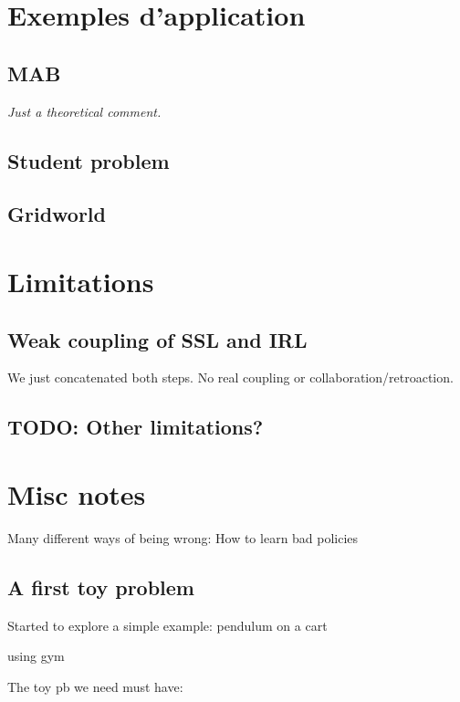 \documentclass{article}
\begin{document}
\section{Exemples d'application}

\subsection{MAB}

\emph{Just a theoretical comment.}

\subsection{Student problem}

\subsection{Gridworld}


\section{Limitations}

\subsection{Weak coupling of SSL and IRL}

We just concatenated both steps. No real coupling or collaboration/retroaction.

\subsection{TODO: Other limitations?}

\section{Misc notes}

Many different ways of being wrong: How to learn bad policies



\subsection{A first toy problem}

Started to explore a simple example: pendulum on a cart

using gym

The toy pb we need must have:
\end{document}
